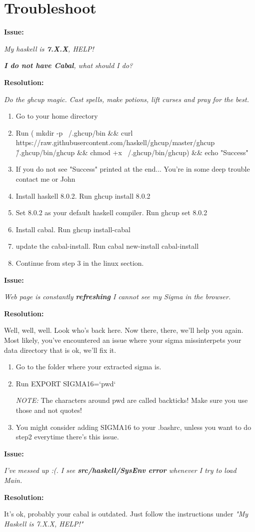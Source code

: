 \documentclass{article}
\begin{document}
\section{Troubleshoot}

 \textbf{Issue:}
 
\textit{ My haskell is \textbf{7.X.X}, HELP!}
 
\textit{ \textbf{I do not have Cabal}, what should I do?}

\textbf{Resolution:}
 
        \textit{Do the ghcup magic. Cast spells, make potions, lift curses and pray for the best.}
        
        \begin{enumerate}
             
        \item Go to your home directory
        \item Run ( mkdir -p ~/.ghcup/bin \&\& curl https://raw.githubusercontent.com/haskell/ghcup/master/ghcup \> \~/.ghcup/bin/ghcup \&\& chmod +x ~/.ghcup/bin/ghcup) \&\& echo "Success"
        \item If you do not see "Success" printed at the end... You're in some deep trouble contact me or John
        \item Install haskell 8.0.2. Run ghcup install 8.0.2
        \item Set 8.0.2 as your default haskell compiler. Run ghcup set 8.0.2
        \item Install cabal. Run ghcup install-cabal
        \item update the cabal-install. Run cabal new-install cabal-install
        \item Continue from step 3 in the linux section.
        \end{enumerate}

 \textbf{Issue:}
 
 \textit{Web page is constantly \textbf{refreshing} I cannot see my Sigma in the browser.}
 
 \textbf{Resolution:}
 
        Well, well, well. Look who's back here. Now there, there, we'll help you again. Most likely, you've encountered an issue where your sigma missinterpets your data directory that is ok, we'll fix it.
        \begin{enumerate}
             
        
        \item Go to the folder where your extracted sigma is.
        \item Run EXPORT SIGMA16=`pwd`
        
        \textit{NOTE:} The characters around pwd are called backticks! Make sure you use those and not quotes!
	\item You might consider adding SIGMA16 to your .bashrc, unless you want to do step2 everytime there's this issue.
    \end{enumerate}

 \textbf{Issue:} 
 
 \textit{I've messed up :(. I see \textbf{src/haskell/SysEnv error} whenever I try to load Main.}
 
 \textbf{Resolution:}
 
        It's ok, probably your cabal is outdated. Just follow the instructions under \textit{"My Haskell is 7.X.X, HELP!"}
\end{document}
